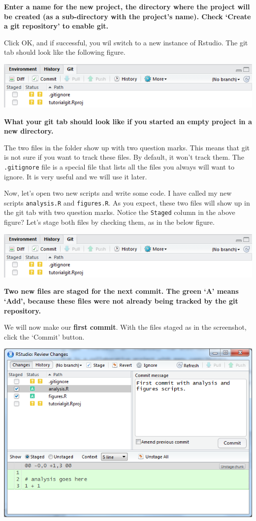 \documentclass[]{book}
\begin{document}
\textbf{Enter a name for the new project, the directory where the project will be created (as a sub-directory with the project's name). Check `Create a git repository' to enable git.}

Click OK, and if successful, you wil switch to a new instance of Rstudio. The git tab should look like the following figure.

\includegraphics[width=0.75\linewidth]{screenshots/gittabnewproject}

\textbf{What your git tab should look like if you started an empty project in a new directory.}

The two files in the folder show up with two question marks. This means that git is not sure if you want to track these files. By default, it won't track them. The \texttt{.gitignore} file is a special file that lists all the files you always will want to ignore. It is very useful and we will use it later.

Now, let's open two new scripts and write some code. I have called my new scripts \texttt{analysis.R} and \texttt{figures.R}. As you expect, these two files will show up in the git tab with two question marks. Notice the \texttt{Staged} column in the above figure? Let's stage both files by checking them, as in the below figure.

\includegraphics[width=0.75\linewidth]{screenshots/gittabnewproject}

\textbf{Two new files are staged for the next commit. The green `A' means `Add', because these files were not already being tracked by the git repository.}

We will now make our \textbf{first commit}. With the files staged as in the screenshot, click the `Commit' button.

\includegraphics[width=0.75\linewidth]{screenshots/gitfirstcommit}
\end{document}
